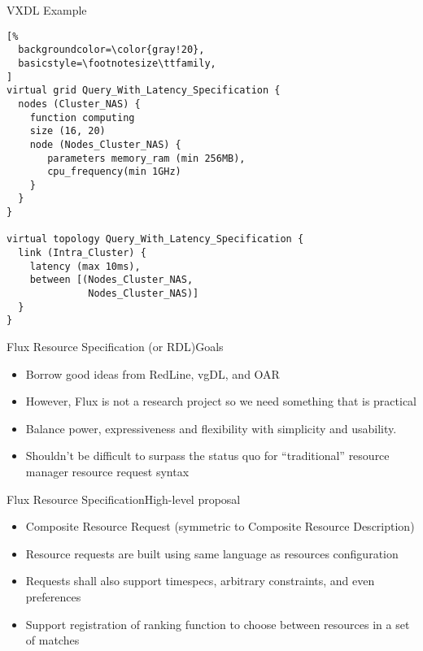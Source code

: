 \documentclass{beamer}
\begin{document}
\begin{frame}[fragile]{VXDL Example}
\begin{lstlisting}[%
  backgroundcolor=\color{gray!20},
  basicstyle=\footnotesize\ttfamily,
]
virtual grid Query_With_Latency_Specification {
  nodes (Cluster_NAS) {
    function computing
    size (16, 20)
    node (Nodes_Cluster_NAS) {
       parameters memory_ram (min 256MB),
       cpu_frequency(min 1GHz)
    }
  }
}

virtual topology Query_With_Latency_Specification {
  link (Intra_Cluster) {
    latency (max 10ms),
    between [(Nodes_Cluster_NAS,
              Nodes_Cluster_NAS)]
  }
}
\end{lstlisting}
\end{frame}

\begin{frame}{Flux Resource Specification (or RDL)}{Goals}
\begin{itemize}
 \item Borrow good ideas from RedLine, vgDL, and OAR
 \item However, Flux is not a research project so we need something
        that is practical
 \item Balance power, expressiveness and flexibility with simplicity and
        usability.
 \item Shouldn't be difficult to surpass the status quo for ``traditional''
        resource manager resource request syntax
\end{itemize}
\end{frame}

\begin{frame}{Flux Resource Specification}{High-level proposal}
\begin{itemize}
 \item<+-> Composite Resource Request (symmetric to Composite Resource Description)
 \item<+-> Resource requests are built using same language as resources configuration
 \item<+-> Requests shall also support timespecs, arbitrary constraints, and
       even preferences
 \item<+-> Support registration of ranking function to choose between resources in a set of matches
\end{itemize}
\end{frame}
\end{document}
